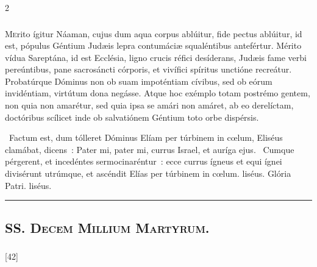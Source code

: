 \documentclass[9pt,twoside]{extarticle}
\begin{document}
\begin{multicols}{2}
{\subsubsection*{\center {}}
\lettrine{M}erito ígitur Náaman, cujus dum aqua corpus ablúitur, fide pectus ablúitur, id est, pópulus Géntium Judæis lepra contumáciæ squaléntibus antefértur. Mérito vídua Sareptána, id est Ecclésia, ligno crucis réfici desíderans, Judæis fame verbi pereúntibus, pane sacrosáncti córporis, et vivífici spíritus unctióne recreátur. Probatúrque Dóminus non ob suam impoténtiam cívibus, sed ob eórum invidéntiam, virtútum dona negásse. Atque hoc exémplo totam postrémo gentem, non quia non amarétur, sed quia ipsa se amári non amáret, ab eo derelíctam, doctóribus scílicet inde ob salvatiónem Géntium toto orbe dispérsis.

\begin{tightlist}{}
\item {}~Factum est, dum tólleret Dóminus Elíam per túrbinem in cœlum, \textred{*} Eliséus clamábat, dicens~: Pater mi, pater mi, currus Israel, et auríga ejus. ~Cumque pérgerent, et incedéntes sermocinaréntur~: ecce currus ígneus et equi ígnei divisérunt utrúmque, et ascéndit Elías per túrbinem in cœlum. liséus. Glória Patri. liséus.
\item {}
\end{tightlist}

\begin{center}\textcolor{red}{\rule{\linewidth}{0.5pt}} \end{center}

\subsection*{\center {}}
\subsection*{\center \textsc{SS. Decem Millium Martyrum.}}
\subsubsection*{\center {}}

\begin{tightlist}{}
\item {} [42] 
\end{tightlist}

}
\end{multicols}
\end{document}
